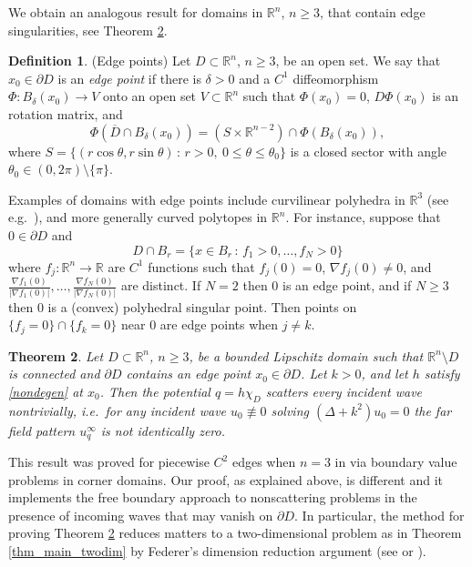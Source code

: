 \documentclass[11pt,a4paper]{amsart}
\newtheorem{Theorem}{Theorem}[section]
\theoremstyle{definition}
\newtheorem{Definition}[Theorem]{Definition}
\numberwithin{equation}{section}
\newcommand{\mR}{\mathbb{R}}                    %
\newcommand{\ol}[1]{\overline{#1}}
\newcommand{\p}{\partial}
\begin{document}
We obtain an analogous result for domains in $\mR^n$, $n \geq 3$, that contain edge singularities, see Theorem \ref{thm_main_ndim}.

\begin{Definition}(Edge points) \label{def_edge_point}
Let $D \subset \mR^n$, $n \geq 3$, be an open set. We say that $x_0 \in \p D$ is an \emph{edge point} if there is $\delta > 0$ and a $C^1$ diffeomorphism $\Phi: B_\delta(x_0) \to V$ onto an open set $V \subset \mR^n$ such that $\Phi(x_0) = 0$, $D\Phi(x_0)$ is an rotation matrix, and 
\[
\Phi(\ol{D} \cap B_\delta(x_0)) = (S \times \mR^{n-2}) \cap \Phi(B_\delta(x_0)),
\]
where $S = \{ (r \cos \theta, r \sin \theta) \,:\, r > 0,\ 0 \leq \theta \leq \theta_0 \}$ is a closed sector with angle $\theta_0 \in (0,2\pi) \setminus \{\pi\}$.
\end{Definition}

Examples of domains with edge points include curvilinear polyhedra in $\mR^3$ (see e.g.\ \cite{ElschnerHu2}), and more generally curved polytopes in $\mR^n$. For instance, suppose that $0 \in \p D$ and 
\[
D \cap B_r = \{ x \in B_r \,:\, f_1 > 0, \ldots, f_N > 0 \}
\]
where $f_j: \mR^n \to \mR$ are $C^1$ functions such that $f_j(0) = 0$, $\nabla f_j(0) \neq 0$, and $\frac{\nabla f_1(0)}{|\nabla f_1(0)|}, \ldots, \frac{\nabla f_N(0)}{|\nabla f_N(0)|}$ are distinct. If $N=2$ then $0$ is an edge point, and if $N \geq 3$ then $0$ is a (convex) polyhedral singular point. Then points on $\{ f_j = 0 \} \cap \{ f_k = 0\}$ near $0$ are edge points when $j \neq k$. 


\begin{Theorem} \label{thm_main_ndim}
Let $D \subset \mR^n$, $n \geq 3$, be a bounded Lipschitz domain such that $\mR^n \setminus D$ is connected and $\p D$ contains an edge point $x_0 \in \p D$. Let $k > 0$, and let $h$ satisfy \eqref{nondegen} at $x_0$. Then the potential $q = h \chi_D$ scatters every incident wave nontrivially, i.e.\ for any incident wave $u_0 \not\equiv 0$ solving $(\Delta+k^2)u_0=0$ the far field pattern $u_q^{\infty}$ is not identically zero.
\end{Theorem}





This result was proved for piecewise $C^2$ edges when $n=3$ in \cite{ElschnerHu2} via boundary value problems in corner domains. Our proof, as explained above, is different and it implements the free boundary approach to nonscattering problems in the presence of incoming waves that may vanish on $\p D$. 
In particular, the method for proving Theorem \ref{thm_main_ndim} reduces matters to a two-dimensional problem as in Theorem \ref{thm_main_twodim} by Federer's dimension reduction argument (see \cite{Weiss1999} or \cite[Lemma 10.9]{Velichkov2023}).
\end{document}
